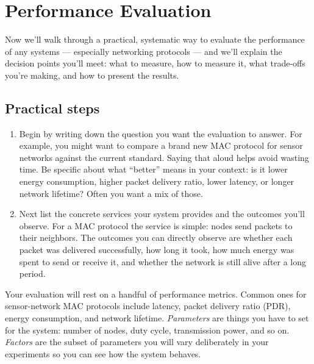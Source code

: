 \chapter{Performance Evaluation}
Now we’ll walk through a practical, systematic way to evaluate the performance of any systems — especially networking protocols — and we’ll explain the decision points you’ll meet: what to measure, how to measure it, what trade-offs you’re making, and how to present the results.

\section{Practical steps}
\begin{enumerate}
    \item Begin by writing down the question you want the evaluation to answer. For example, you might want to compare a brand new MAC protocol for sensor networks against the current standard. Saying that aloud helps avoid wasting time. Be specific about what “better” means in your context: is it lower energy consumption, higher packet delivery ratio, lower latency, or longer network lifetime? Often you want a mix of those.
    \item Next list the concrete services your system provides and the outcomes you’ll observe. For a MAC protocol the service is simple: nodes send packets to their neighbors. The outcomes you can directly observe are whether each packet was delivered successfully, how long it took, how much energy was spent to send or receive it, and whether the network is still alive after a long period.
\end{enumerate}
Your evaluation will rest on a handful of performance metrics. Common ones for sensor-network MAC protocols include latency, packet delivery ratio (PDR), energy consumption, and network lifetime.
\textit{Parameters} are things you have to set for the system: number of nodes, duty cycle, transmission power, and so on. \textit{Factors} are the subset of parameters you will vary deliberately in your experiments so you can see how the system behaves.
    
